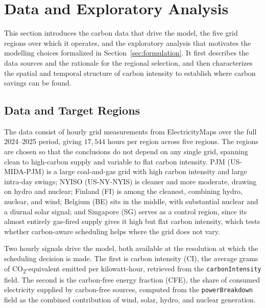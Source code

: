 \section{Data and Exploratory Analysis}
\label{sec:problem}

This section introduces the carbon data that drive the model, the five grid regions over which it operates, and the exploratory analysis that motivates the modelling choices formalized in Section~\ref{sec:formulation}. It first describes the data sources and the rationale for the regional selection, and then characterizes the spatial and temporal structure of carbon intensity to establish where carbon savings can be found.

\FloatBarrier
\subsection{Data and Target Regions}
\label{sec:prob-data}

The data consist of hourly grid measurements from ElectricityMaps over the full 2024--2025 period, giving $17{,}544$ hours per region across five regions. The regions are chosen so that the conclusions do not depend on any single grid, spanning clean to high-carbon supply and variable to flat carbon intensity. PJM (US-MIDA-PJM) is a large coal-and-gas grid with high carbon intensity and large intra-day swings; NYISO (US-NY-NYIS) is cleaner and more moderate, drawing on hydro and nuclear; Finland (FI) is among the cleanest, combining hydro, nuclear, and wind; Belgium (BE) sits in the middle, with substantial nuclear and a diurnal solar signal; and Singapore (SG) serves as a control region, since its almost entirely gas-fired supply gives it high but flat carbon intensity, which tests whether carbon-aware scheduling helps where the grid does not vary.

Two hourly signals drive the model, both available at the resolution at which the scheduling decision is made. The first is carbon intensity (CI), the average grams of CO\textsubscript{2}-equivalent emitted per kilowatt-hour, retrieved from the \texttt{carbonIntensity} field. The second is the carbon-free energy fraction (CFE), the share of consumed electricity supplied by carbon-free sources, computed from the \texttt{powerBreakdown} field as the combined contribution of wind, solar, hydro, and nuclear generation.

